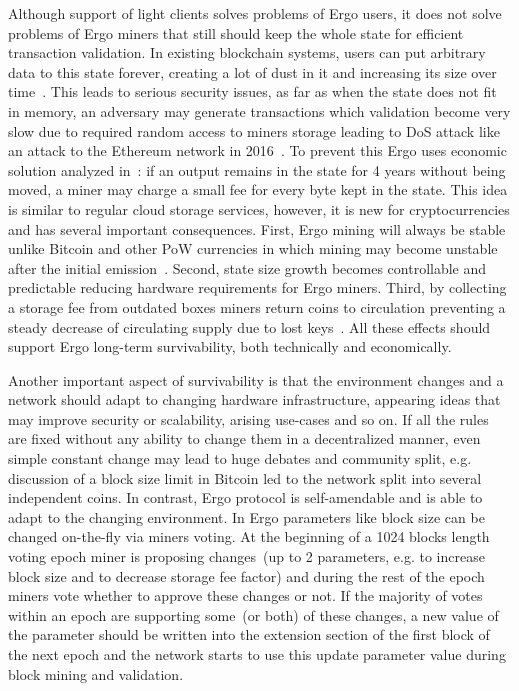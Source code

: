 Although support of light clients solves problems of Ergo users, it does not solve problems
of Ergo miners that still should keep the whole state for efficient
transaction validation.
In existing blockchain systems, users can put arbitrary data to this state forever,
creating a lot of dust in it and increasing its size over time~\cite{perez2019another}.
This leads to serious security issues, as far as when the state does not fit in memory,
an adversary may generate transactions which validation become very slow due to required random
access to miners storage
leading to DoS attack like an attack to the Ethereum network in 2016~\cite{??}.
To prevent this Ergo uses economic solution analyzed in~\cite{chepurnoy2018systematic}: if an
output remains in the state for 4 years without being moved, a miner may charge a small fee for every
byte kept in the state.
This idea is similar to regular cloud storage services, however, it is new for
cryptocurrencies and has several important consequences.
First, Ergo mining will always be stable unlike Bitcoin and other PoW currencies
in which mining may become unstable after the
initial emission~\cite{carlsten2016instability}.
Second, state size growth becomes controllable and predictable reducing hardware requirements for Ergo miners.
Third, by collecting a storage fee from outdated boxes miners return coins to circulation preventing a steady decrease
of circulating supply due to lost keys~\cite{wsj2018}.
All these effects should support Ergo long-term survivability, both technically and economically.

Another important aspect of survivability is that the environment changes and a network should
adapt to changing hardware infrastructure, appearing ideas that may improve security or
scalability, arising use-cases and so on.
If all the rules are fixed without any ability to change them in a decentralized manner, even
simple constant change may lead to huge debates and community split, e.g. discussion of a block
size limit in Bitcoin led to the network split into several independent coins.
In contrast, Ergo protocol is self-amendable and is able to adapt to the changing environment.
In Ergo parameters like block size can be changed on-the-fly via miners voting.
At the beginning of a 1024 blocks length voting epoch miner is proposing changes~(up to 2 parameters,
e.g. to increase block size and to decrease storage fee factor) and during the rest of the epoch miners
vote whether to approve these changes or not.
If the majority of votes within an epoch are supporting some~(or both) of these changes, a new value of the
parameter should be written into the extension section of the first block of the next epoch and the
network starts to use this update parameter value during block mining and validation.

